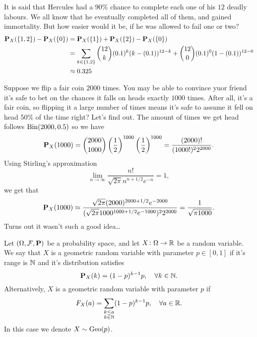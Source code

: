 \documentclass[11pt,a4paper]{article}
\begin{document}
  \begin{example}
  It is said that Hercules had a $90\%$ chance to complete each
  one of his $12$ deadly labours. We all know that he eventually completed
  all of them, and gained immortality. But how easier would it be, if he
  was allowed to fail one or two?
  \begin{align*}
    \mathbf{P}_X(\{1,2\}) - \mathbf{P}_X(\{0\}) &=
    \mathbf{P}_X(\{1\}) + \mathbf{P}_X(\{2\}) - \mathbf{P}_X(\{0\}) \\ &=
    \sum_{k \in \{1,2\}}
    \binom{12}{k} (0.1)^k (k - (0.1))^{12-k} +
    \binom{12}{0} (0.1)^0 (1 - (0.1))^{12-0} \\ &\approx
    0.325
  \end{align*}
  \end{example}
  \begin{example}
    Suppose we flip a fair coin $2000$ times. You may be able to convince
    yuor friend it's safe to bet on the chances it falls on heads exactly
    $1000$ times. After all, it's a fair coin, so flipping it a large number
    of times means it's safe to assume it fell on head $50\%$ of the time
    right? Let's find out. The amount of times we get head follows
    $\operatorname{Bin}(2000,0.5)$ so we have
    \[
      \mathbf{P}_{X}(1000) =
      \binom{2000}{1000} \left(\frac{1}{2}\right)^{1000}
      \left(\frac{1}{2}\right)^{1000} =
      \frac{(2000)!}{(1000!)^{2}2^{2000}}.
    \]
    Using Stirling's approximation
    \[
      \lim_{n\rightarrow\infty}
      {\frac{n!}{\sqrt{2\pi}n^{n+1/2}e^{-n}}}=1,
    \]
    we get that
    \[
      \mathbf{P}_{X}(1000) \approx
      \frac{\sqrt{2\pi}(2000)^{2000+1/2}e^{-2000}}
          {({\sqrt{2\pi}}1000^{1000+1/2}e^{-1000})^{2}2^{2000}} =
      {\frac{1}{\sqrt{\pi 1000}}}.
    \]
    Turns out it wasn't such a good idea\dots
  \end{example}

  \begin{definition}
    Let $(\Omega ,\mathcal F, \mathbf{P})$ be a probability space,
    and let $X \colon \Omega \to \mathbb{R}$ be a random variable.
    We say that $X$ is a geometric random variable with parameter
    $p \in [0,1]$ if it's range is $\mathbb{N}$ and it's distribution satisfies
    \[
      \mathbf{P}_X(k) = (1-p)^{k-1} p, \quad 
      \forall k \in \mathbb{N}.
    \]
    Alternatively, $X$ is a geometric random variable with parameter
    $p$ if
    \[
      F_X(a) = \sum_{\substack{k \le a \\ k \in \mathbb{N}}}
      (1-p)^{k-1} p, \quad \forall a \in \mathbb{R}.
    \]
    In this case we denote $X \sim \operatorname{Geo}(p)$.
  \end{definition}
  
\end{document}
